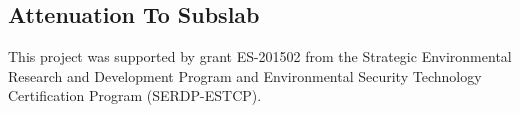\documentclass[journal=esthag,manuscript=article]{achemso}
\begin{document}
\begin{comment}
The trends in Figure \ref{fig:land_drain_scenarios_fluctuating_ae} are the same as in Figure \ref{fig:land_drain_scenarios_constant_ae}, but it is clear that much more variability is accounted for, especially considering the majority of datapoints were recorded between -3 and 3 Pa (the bins are evenly spaced, not evenly sized).
More e


\end{comment}








\subsection{Attenuation To Subslab} %





\begin{acknowledgement}
  This project was supported by grant ES-201502 from the Strategic Environmental Research and Development Program and Environmental Security Technology Certification Program (SERDP-ESTCP).
\end{acknowledgement}


\end{document}
